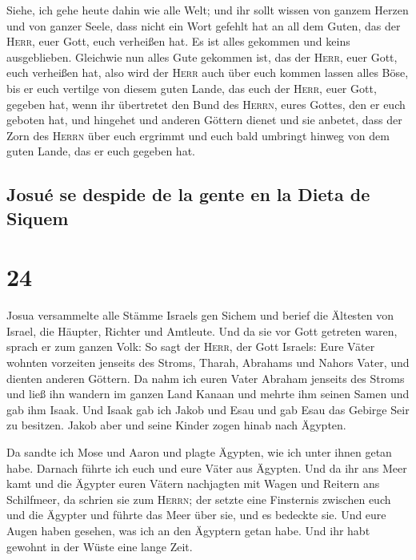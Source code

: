  Siehe, ich gehe heute dahin wie alle Welt; und ihr sollt
wissen von ganzem Herzen und von ganzer Seele, dass nicht ein Wort
gefehlt hat an all dem Guten, das der \textsc{Herr}, euer Gott, euch
verheißen hat. Es ist alles gekommen und keins ausgeblieben.
 Gleichwie nun alles Gute gekommen ist, das der
\textsc{Herr}, euer Gott, euch verheißen hat, also wird der
\textsc{Herr} auch über euch kommen lassen alles Böse, bis er euch
vertilge von diesem guten Lande, das euch der \textsc{Herr}, euer Gott,
gegeben hat,  wenn ihr übertretet den Bund des
\textsc{Herrn}, eures Gottes, den er euch geboten hat, und hingehet und
anderen Göttern dienet und sie anbetet, dass der Zorn des \textsc{Herrn}
über euch ergrimmt und euch bald umbringt hinweg von dem guten Lande,
das er euch gegeben hat.

\hypertarget{josuuxe9-se-despide-de-la-gente-en-la-dieta-de-siquem}{%
\subsection{Josué se despide de la gente en la Dieta de
Siquem}\label{josuuxe9-se-despide-de-la-gente-en-la-dieta-de-siquem}}

\hypertarget{section-23}{%
\section{24}\label{section-23}}

 Josua versammelte alle Stämme Israels gen Sichem und
berief die Ältesten von Israel, die Häupter, Richter und Amtleute. Und
da sie vor Gott getreten waren,  sprach er zum ganzen
Volk: So sagt der \textsc{Herr}, der Gott Israels: Eure Väter wohnten
vorzeiten jenseits des Stroms, Tharah, Abrahams und Nahors Vater, und
dienten anderen Göttern.  Da nahm ich euren Vater Abraham
jenseits des Stroms und ließ ihn wandern im ganzen Land Kanaan und
mehrte ihm seinen Samen und gab ihm Isaak.  Und Isaak gab
ich Jakob und Esau und gab Esau das Gebirge Seir zu besitzen. Jakob aber
und seine Kinder zogen hinab nach Ägypten.

 Da sandte ich Mose und Aaron und plagte Ägypten, wie ich
unter ihnen getan habe.  Darnach führte ich euch und eure
Väter aus Ägypten. Und da ihr ans Meer kamt und die Ägypter euren Vätern
nachjagten mit Wagen und Reitern ans Schilfmeer,  da
schrien sie zum \textsc{Herrn}; der setzte eine Finsternis zwischen euch
und die Ägypter und führte das Meer über sie, und es bedeckte sie. Und
eure Augen haben gesehen, was ich an den Ägyptern getan habe. Und ihr
habt gewohnt in der Wüste eine lange Zeit.

